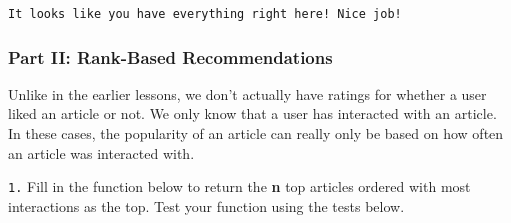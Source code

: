 \documentclass[11pt]{article}
\begin{document}
    \begin{Verbatim}[commandchars=\\\{\}]
It looks like you have everything right here! Nice job!

    \end{Verbatim}

    \subsubsection{Part II: Rank-Based
Recommendations}\label{part-ii-rank-based-recommendations}

Unlike in the earlier lessons, we don't actually have ratings for
whether a user liked an article or not. We only know that a user has
interacted with an article. In these cases, the popularity of an article
can really only be based on how often an article was interacted with.

\texttt{1.} Fill in the function below to return the \textbf{n} top
articles ordered with most interactions as the top. Test your function
using the tests below.
\end{document}
